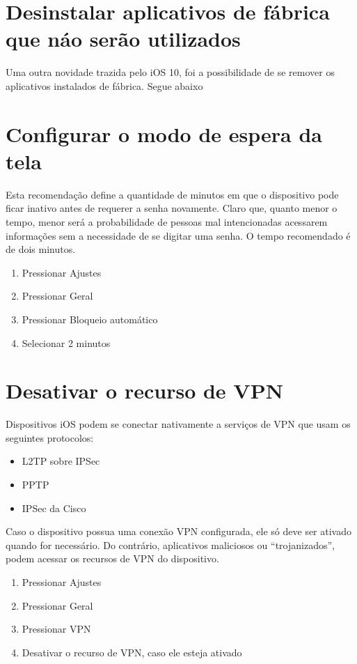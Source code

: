 \section{Desinstalar aplicativos de f\'abrica que n\'ao ser\~ao utilizados}

Uma outra novidade trazida pelo iOS 10, foi a possibilidade de se remover os aplicativos instalados de f\'abrica. Segue abaixo 

\section{Configurar o modo de espera da tela}

Esta recomenda\c c\~ao define a quantidade de minutos em que o dispositivo pode ficar inativo antes de requerer a senha novamente. Claro que, quanto menor o tempo, menor ser\'a a probabilidade de pessoas mal intencionadas acessarem informa\c c\~oes sem a necessidade de se digitar uma senha. O tempo recomendado \'e de dois minutos.

\begin{enumerate}
\item Pressionar Ajustes
\item Pressionar Geral
\item Pressionar Bloqueio autom\'atico
\item Selecionar 2 minutos
\end{enumerate}

\section{Desativar o recurso de VPN} 

Dispositivos iOS podem se conectar nativamente a servi\c cos de VPN que usam os seguintes protocolos:

\begin{itemize}
\item L2TP sobre IPSec
\item PPTP
\item IPSec da Cisco
\end{itemize}

Caso o dispositivo possua uma conex\~ao VPN configurada, ele s\'o deve ser ativado quando for necess\'ario. Do contr\'ario, aplicativos maliciosos ou ``trojanizados'', podem acessar os recursos de VPN do dispositivo.

\begin{enumerate}
\item Pressionar Ajustes
\item Pressionar Geral
\item Pressionar VPN
\item Desativar o recurso de VPN, caso ele esteja ativado
\end{enumerate}

